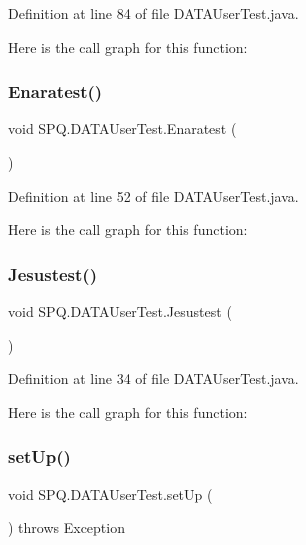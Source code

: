 Definition at line 84 of file D\+A\+T\+A\+User\+Test.\+java.

Here is the call graph for this function\+:
\mbox{\label{class_s_p_q_1_1_d_a_t_a_user_test_a84d1c3d3992383e1cb93d07241cf3f02}} 
\subsubsection{\texorpdfstring{Enaratest()}{Enaratest()}}
{\footnotesize\ttfamily void S\+P\+Q.\+D\+A\+T\+A\+User\+Test.\+Enaratest (\begin{DoxyParamCaption}{ }\end{DoxyParamCaption})}



Definition at line 52 of file D\+A\+T\+A\+User\+Test.\+java.

Here is the call graph for this function\+:
\mbox{\label{class_s_p_q_1_1_d_a_t_a_user_test_a29a15c9122a588e854a02c6c2fe1d203}} 
\subsubsection{\texorpdfstring{Jesustest()}{Jesustest()}}
{\footnotesize\ttfamily void S\+P\+Q.\+D\+A\+T\+A\+User\+Test.\+Jesustest (\begin{DoxyParamCaption}{ }\end{DoxyParamCaption})}



Definition at line 34 of file D\+A\+T\+A\+User\+Test.\+java.

Here is the call graph for this function\+:
\mbox{\label{class_s_p_q_1_1_d_a_t_a_user_test_a703753b88018d83f5a2d3b76d335889a}} 
\subsubsection{\texorpdfstring{set\+Up()}{setUp()}}
{\footnotesize\ttfamily void S\+P\+Q.\+D\+A\+T\+A\+User\+Test.\+set\+Up (\begin{DoxyParamCaption}{ }\end{DoxyParamCaption}) throws Exception}



